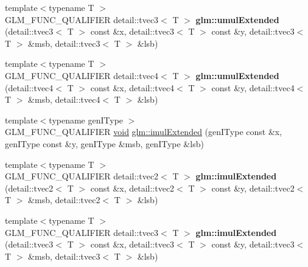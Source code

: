 \begin{DoxyCompactItemize}
\item 
\hypertarget{namespaceglm_a0b3d52bde31bea183a58c5474e894d82}{}{\footnotesize template$<$typename T $>$ }\\G\+L\+M\+\_\+\+F\+U\+N\+C\+\_\+\+Q\+U\+A\+L\+I\+F\+I\+E\+R detail\+::tvec3$<$ T $>$ {\bfseries glm\+::umul\+Extended} (detail\+::tvec3$<$ T $>$ const \&x, detail\+::tvec3$<$ T $>$ const \&y, detail\+::tvec3$<$ T $>$ \&msb, detail\+::tvec3$<$ T $>$ \&lsb)\label{namespaceglm_a0b3d52bde31bea183a58c5474e894d82}

\item 
\hypertarget{namespaceglm_a0516c3b14eb0df2ce7002e04de45f0a1}{}{\footnotesize template$<$typename T $>$ }\\G\+L\+M\+\_\+\+F\+U\+N\+C\+\_\+\+Q\+U\+A\+L\+I\+F\+I\+E\+R detail\+::tvec4$<$ T $>$ {\bfseries glm\+::umul\+Extended} (detail\+::tvec4$<$ T $>$ const \&x, detail\+::tvec4$<$ T $>$ const \&y, detail\+::tvec4$<$ T $>$ \&msb, detail\+::tvec4$<$ T $>$ \&lsb)\label{namespaceglm_a0516c3b14eb0df2ce7002e04de45f0a1}

\item 
{\footnotesize template$<$typename gen\+I\+Type $>$ }\\G\+L\+M\+\_\+\+F\+U\+N\+C\+\_\+\+Q\+U\+A\+L\+I\+F\+I\+E\+R \hyperlink{_s_d_l__audio_8h_a52835ae37c4bb905b903cbaf5d04b05f}{void} \hyperlink{group__core__func__integer_ga7d284e3ea5059cae9fe8f0fe1a76dd02}{glm\+::imul\+Extended} (gen\+I\+Type const \&x, gen\+I\+Type const \&y, gen\+I\+Type \&msb, gen\+I\+Type \&lsb)
\item 
\hypertarget{namespaceglm_a040e40acaab0ca3e99f14ca99f83c9b5}{}{\footnotesize template$<$typename T $>$ }\\G\+L\+M\+\_\+\+F\+U\+N\+C\+\_\+\+Q\+U\+A\+L\+I\+F\+I\+E\+R detail\+::tvec2$<$ T $>$ {\bfseries glm\+::imul\+Extended} (detail\+::tvec2$<$ T $>$ const \&x, detail\+::tvec2$<$ T $>$ const \&y, detail\+::tvec2$<$ T $>$ \&msb, detail\+::tvec2$<$ T $>$ \&lsb)\label{namespaceglm_a040e40acaab0ca3e99f14ca99f83c9b5}

\item 
\hypertarget{namespaceglm_a66babe617fc3264888469469d6e2dede}{}{\footnotesize template$<$typename T $>$ }\\G\+L\+M\+\_\+\+F\+U\+N\+C\+\_\+\+Q\+U\+A\+L\+I\+F\+I\+E\+R detail\+::tvec3$<$ T $>$ {\bfseries glm\+::imul\+Extended} (detail\+::tvec3$<$ T $>$ const \&x, detail\+::tvec3$<$ T $>$ const \&y, detail\+::tvec3$<$ T $>$ \&msb, detail\+::tvec3$<$ T $>$ \&lsb)\label{namespaceglm_a66babe617fc3264888469469d6e2dede}


\end{DoxyCompactItemize}
